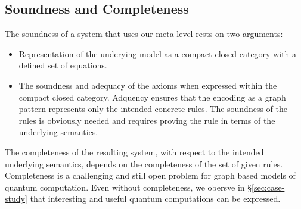 \documentclass[runningheads]{llncs}
\begin{document}
\subsection{Soundness and Completeness} 

The soundness of a system that uses our meta-level rests on two
arguments: 

\begin{itemize}
\item Representation of the underying model as a compact closed
  category with a defined set of equations.

\item The soundness and adequacy of the axioms when expressed within
  the compact closed category. Adquency ensures that the encoding as a
  graph pattern represents only the intended concrete rules. The
  soundness of the rules is obviously needed and requires proving the
  rule in terms of the underlying semantics.
\end{itemize}

The completeness of the resulting system, with respect to the intended
underlying semantics, depends on the completeness of the set of given
rules. Completeness is a challenging and still open problem for graph
based models of quantum computation. Even without completeness, we
obersve in \S\ref{sec:case-study} that interesting and useful quantum
computations can be expressed.






\end{document}
